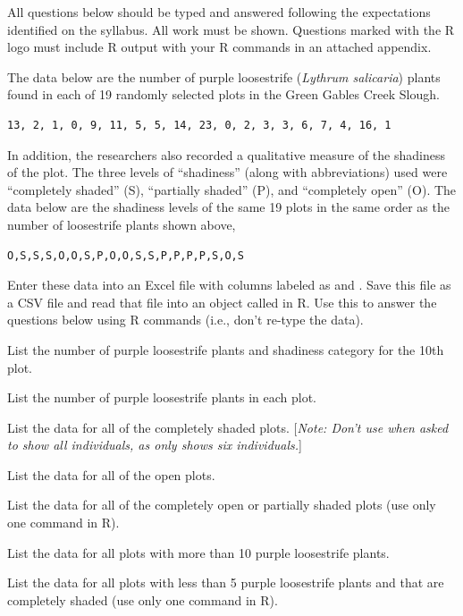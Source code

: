 \documentclass[10pt,openany]{book}\usepackage[]{graphicx}\usepackage[]{color}
\begin{document}
\newpage
\begin{hwsection}{All questions below should be typed and answered following the expectations identified on the syllabus.  All work must be shown.  Questions marked with the R logo must include R output with your R commands in an attached appendix.}

  \item \label{hwprob:RBasicsPL1} \rhw{} The data below are the number of purple loosestrife (\textit{Lythrum salicaria}) plants found in each of 19 randomly selected plots in the Green Gables Creek Slough.

    \begin{Verbatim}[xleftmargin=5mm]
13, 2, 1, 0, 9, 11, 5, 5, 14, 23, 0, 2, 3, 3, 6, 7, 4, 16, 1
    \end{Verbatim}

In addition, the researchers also recorded a qualitative measure of the shadiness of the plot.  The three levels of ``shadiness'' (along with abbreviations) used were ``completely shaded'' (S), ``partially shaded'' (P), and ``completely open'' (O).  The data below are the shadiness levels of the same 19 plots in the same order as the number of loosestrife plants shown above,

    \begin{Verbatim}[xleftmargin=5mm]
O,S,S,S,O,O,S,P,O,O,S,S,P,P,P,P,S,O,S
    \end{Verbatim}

Enter these data into an Excel file with columns labeled as  and .  Save this file as a CSV file and read that file into an object called  in R.  Use this to answer the questions below using R commands (i.e., don't re-type the data).

  \begin{Enumerate}
    \item List the number of purple loosestrife plants and shadiness category for the 10th plot.
    \item List the number of purple loosestrife plants in each plot.
    \item List the data for all of the completely shaded plots.  [\emph{Note: Don't use  when asked to show all individuals, as  only shows six individuals.}]
    \item List the data for all of the open plots.
    \item List the data for all of the completely open or partially shaded plots (use only one command in R).
    \item List the data for all plots with more than 10 purple loosestrife plants.
    \item List the data for all plots with less than 5 purple loosestrife plants and that are completely shaded (use only one command in R).
  \end{Enumerate}
\end{hwsection}
\end{document}
